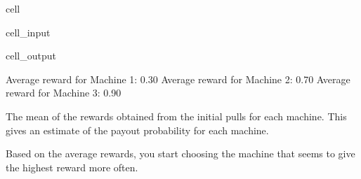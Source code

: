 \documentclass[letterpaper,10pt,english]{jupyterBook}
\begin{document}
\begin{sphinxuseclass}{cell}\begin{sphinxVerbatimInput}

\begin{sphinxuseclass}{cell_input}
\begin{sphinxVerbatim}[commandchars=\\\{\}]
  \PYG{p}{[}    \PYG{p}{]}

    
\end{sphinxVerbatim}

\end{sphinxuseclass}\end{sphinxVerbatimInput}
\begin{sphinxVerbatimOutput}

\begin{sphinxuseclass}{cell_output}
\begin{sphinxVerbatim}[commandchars=\\\{\}]
Average reward for Machine 1: 0.30
Average reward for Machine 2: 0.70
Average reward for Machine 3: 0.90
\end{sphinxVerbatim}

\end{sphinxuseclass}\end{sphinxVerbatimOutput}

\end{sphinxuseclass}
\sphinxAtStartPar
The mean of the rewards obtained from the initial pulls for each machine. This gives an estimate of the payout probability for each machine.

\sphinxAtStartPar
{}

\sphinxAtStartPar
Based on the average rewards, you start choosing the machine that seems to give the highest reward more often.
\end{document}
